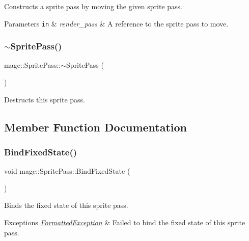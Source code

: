 Constructs a sprite pass by moving the given sprite pass.


\begin{DoxyParams}[1]{Parameters}
\mbox{\tt in}  & {\em render\+\_\+pass} & A reference to the sprite pass to move. \\
\hline
\end{DoxyParams}
\hypertarget{classmage_1_1_sprite_pass_a70a866324750c21196d80364e9a0e309}{}\label{classmage_1_1_sprite_pass_a70a866324750c21196d80364e9a0e309} 
\subsubsection{\texorpdfstring{$\sim$\+Sprite\+Pass()}{~SpritePass()}}
{\footnotesize\ttfamily mage\+::\+Sprite\+Pass\+::$\sim$\+Sprite\+Pass (\begin{DoxyParamCaption}{ }\end{DoxyParamCaption})\hspace{0.3cm}{\ttfamily [default]}}

Destructs this sprite pass. 

\subsection{Member Function Documentation}
\hypertarget{classmage_1_1_sprite_pass_a796f9aad70558e3ae0b792b9c674208d}{}\label{classmage_1_1_sprite_pass_a796f9aad70558e3ae0b792b9c674208d} 
\subsubsection{\texorpdfstring{Bind\+Fixed\+State()}{BindFixedState()}}
{\footnotesize\ttfamily void mage\+::\+Sprite\+Pass\+::\+Bind\+Fixed\+State (\begin{DoxyParamCaption}{ }\end{DoxyParamCaption})}

Binds the fixed state of this sprite pass.


\begin{DoxyExceptions}{Exceptions}
{\em \hyperlink{structmage_1_1_formatted_exception}{Formatted\+Exception}} & Failed to bind the fixed state of this sprite pass. \\
\hline
\end{DoxyExceptions}
\hypertarget{classmage_1_1_sprite_pass_a0044e0756f5f96f24c188424f9769a02}{}\label{classmage_1_1_sprite_pass_a0044e0756f5f96f24c188424f9769a02} 
